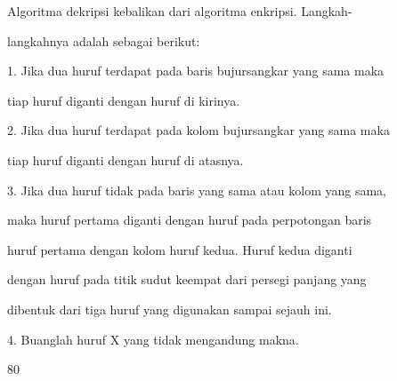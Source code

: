 \documentclass{article}
\begin{document}

Algoritma dekripsi kebalikan dari algoritma enkripsi. Langkah-

langkahnya adalah sebagai berikut:

1. Jika dua huruf terdapat pada baris bujursangkar yang sama maka 

tiap huruf diganti dengan huruf di kirinya.

2. Jika dua huruf terdapat pada kolom bujursangkar yang sama maka 

tiap huruf diganti dengan huruf di atasnya.

3. Jika dua huruf tidak pada baris yang sama atau kolom yang sama, 

maka huruf pertama diganti dengan huruf pada perpotongan baris 

huruf pertama dengan kolom huruf kedua. Huruf kedua diganti 

dengan huruf pada titik sudut keempat dari persegi panjang yang 

dibentuk dari tiga huruf yang digunakan sampai sejauh ini.

4. Buanglah huruf X yang tidak mengandung makna.

80
\end{document}
